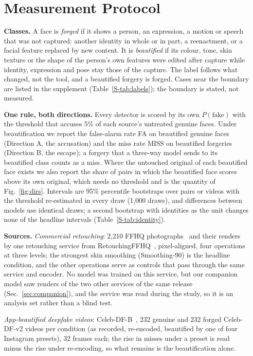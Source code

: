 \documentclass[conference]{IEEEtran}
\begin{document}
\section{Measurement Protocol}
\label{sec:protocol}
\textbf{Classes.} A face is \emph{forged} if it shows a person, an expression, a motion or speech that was not captured:
another identity in whole or in part, a reenactment, or a facial feature replaced by new content. It is \emph{beautified} if
its colour, tone, skin texture or the shape of the person's own features were edited after capture while identity,
expression and pose stay those of the capture. The label follows what changed, not the tool, and a beautified forgery is
forged. Cases near the boundary are listed in the supplement (Table~\ref{S-tab:labels}); the boundary is stated, not
measured.

\textbf{One rule, both directions.} Every detector is scored by its own $P(\text{fake})$ with the threshold that accuses
5\% of each source's untreated genuine faces. Under beautification we report the false-alarm rate FA on beautified genuine
faces (Direction A, the accusation) and the miss rate MISS on beautified forgeries (Direction B, the escape); a forgery that a
three-way model sends to its beautified class counts as a miss. Where the untouched original of each beautified face exists
we also report the share of pairs in which the beautified face scores above its own original, which needs no threshold and
is the quantity of Fig.~\ref{fig:dirs}. Intervals are 95\% percentile bootstraps over pairs or videos with the threshold
re-estimated in every draw (1,000 draws), and differences between models use identical draws; a second bootstrap with
identities as the unit changes none of the headline intervals (Table~\ref{S-tab:identity}).

\textbf{Sources.} \emph{Commercial retouching}: 2,210 FFHQ photographs~\cite{ffhq} and their renders by one retouching
service from RetouchingFFHQ~\cite{retouchingffhq}, pixel-aligned, four operations at three levels; the strongest skin
smoothing (Smoothing-90) is the headline condition, and the other operations serve as controls that pass through the same
service and encoder. No model was trained on this service, but our companion model saw renders of the two other services of the same release (Sec.~\ref{sec:companion}), and the service was read during the study, so it is an analysis set rather than a blind test.

\emph{App-beautified deepfake videos}: Celeb-DF-B~\cite{libourel2024}, 232 genuine and 232 forged
Celeb-DF-v2 videos per condition (as recorded, re-encoded, beautified by one of four Instagram presets), 32 frames each; the
rise in misses under a preset is read minus the rise under re-encoding, so what remains is the beautification alone.
\end{document}
